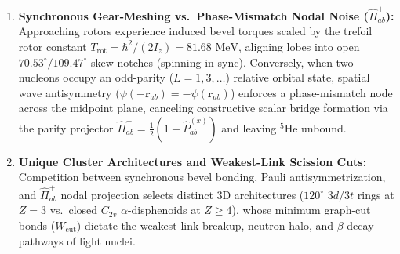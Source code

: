 \documentclass[11pt, a4paper]{article}
\begin{document}
\begin{enumerate}[leftmargin=1.8em, itemsep=3pt]
    \item \textbf{Synchronous Gear-Meshing vs.\ Phase-Mismatch Nodal Noise ($\hat{\Pi}_{ab}^+$):} Approaching rotors experience induced bevel torques scaled by the trefoil rotor constant $T_{\mathrm{rot}} = \hbar^2/(2I_z) = 81.68\text{ MeV}$, aligning lobes into open $70.53^\circ/109.47^\circ$ skew notches (spinning in sync). Conversely, when two nucleons occupy an odd-parity ($L = 1, 3, \dots$) relative orbital state, spatial wave antisymmetry ($\psi(-\mathbf{r}_{ab}) = -\psi(\mathbf{r}_{ab})$) enforces a phase-mismatch node across the midpoint plane, canceling constructive scalar bridge formation via the parity projector $\hat{\Pi}_{ab}^+ = \frac{1}{2}(1 + \hat{P}_{ab}^{(x)})$ and leaving $^5\text{He}$ unbound.
    \item \textbf{Unique Cluster Architectures and Weakest-Link Scission Cuts:} Competition between synchronous bevel bonding, Pauli antisymmetrization, and $\hat{\Pi}_{ab}^+$ nodal projection selects distinct 3D architectures ($120^\circ$ $3d/3t$ rings at $Z = 3$ vs.\ closed $C_{2v}$ $\alpha$-disphenoids at $Z \ge 4$), whose minimum graph-cut bonds ($W_{\mathrm{cut}}$) dictate the weakest-link breakup, neutron-halo, and $\beta$-decay pathways of light nuclei.
\end{enumerate}
\end{document}

